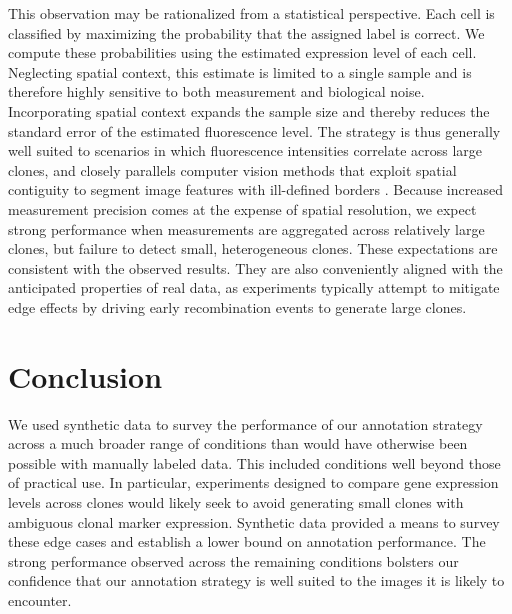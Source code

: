 \documentclass[10pt,letterpaper]{article}
\begin{document}
This observation may be rationalized from a statistical perspective. Each cell is classified by maximizing the probability that the assigned label is correct. We compute these probabilities using the estimated expression level of each cell. Neglecting spatial context, this estimate is limited to a single sample and is therefore highly sensitive to both measurement and biological noise. Incorporating spatial context expands the sample size and thereby reduces the standard error of the estimated fluorescence level. The strategy is thus generally well suited to scenarios in which fluorescence intensities correlate across large clones, and closely parallels computer vision methods that exploit spatial contiguity to segment image features with ill-defined borders \cite{Nguyen2012}. Because increased measurement precision comes at the expense of spatial resolution, we expect strong performance when measurements are aggregated across relatively large clones, but failure to detect small, heterogeneous clones. These expectations are consistent with the observed results. They are also conveniently aligned with the anticipated properties of real data, as experiments typically attempt to mitigate edge effects by driving early recombination events to generate large clones.



\section*{Conclusion}

We used synthetic data to survey the performance of our annotation strategy across a much broader range of conditions than would have otherwise been possible with manually labeled data. This included conditions well beyond those of practical use. In particular, experiments designed to compare gene expression levels across clones would likely seek to avoid generating small clones with ambiguous clonal marker expression. Synthetic data provided a means to survey these edge cases and establish a lower bound on annotation performance. The strong performance observed across the remaining conditions bolsters our confidence that our annotation strategy is well suited to the images it is likely to encounter.
\end{document}
